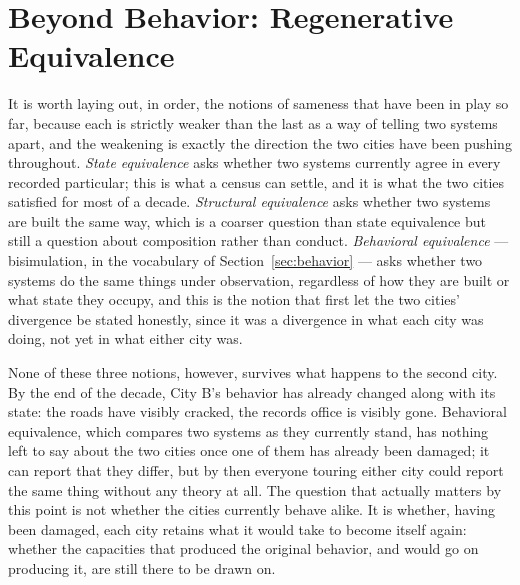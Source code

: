 \documentclass[11pt]{article}
\begin{document}
\section{Beyond Behavior: Regenerative Equivalence}\label{sec:regen}

It is worth laying out, in order, the notions of sameness that have
been in play so far, because each is strictly weaker than the last as
a way of telling two systems apart, and the weakening is exactly the
direction the two cities have been pushing throughout. \emph{State
equivalence} asks whether two systems currently agree in every
recorded particular; this is what a census can settle, and it is what
the two cities satisfied for most of a decade. \emph{Structural
equivalence} asks whether two systems are built the same way, which
is a coarser question than state equivalence but still a question
about composition rather than conduct. \emph{Behavioral equivalence}
--- bisimulation, in the vocabulary of Section~\ref{sec:behavior} ---
asks whether two systems do the same things under observation,
regardless of how they are built or what state they occupy, and this
is the notion that first let the two cities' divergence be stated
honestly, since it was a divergence in what each city was doing, not
yet in what either city was.

None of these three notions, however, survives what happens to the
second city. By the end of the decade, City B's behavior has already
changed along with its state: the roads have visibly cracked, the
records office is visibly gone. Behavioral equivalence, which
compares two systems as they currently stand, has nothing left to say
about the two cities once one of them has already been damaged; it
can report that they differ, but by then everyone touring either city
could report the same thing without any theory at all. The question
that actually matters by this point is not whether the cities
currently behave alike. It is whether, having been damaged, each city
retains what it would take to become itself again: whether the
capacities that produced the original behavior, and would go on
producing it, are still there to be drawn on.
\end{document}
